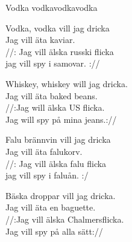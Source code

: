 \begin{song}{Vodka vodka}{vodkavodka}
\begin{vers}
Vodka, vodka vill jag dricka\\
Jag vill äta kaviar.\\
//: Jag vill älska russki flicka\\
jag vill spy i samovar. ://\\
\end{vers}
\begin{vers}
Whiskey, whiskey will jag dricka.\\
Jag vill äta baked beans.\\
//:Jag will älska US flicka.\\
Jag will spy på mina jeans.://\\
\end{vers}
\begin{vers}
Falu brännvin vill jag dricka\\
Jag vill äta falukorv.\\
//: Jag vill älska falu flicka   \\
jag vill spy i faluån. :/\\
\end{vers}
\begin{vers}
	Bäska droppar vill jag dricka.\\
	Jag vill äta en baguette.\\
	//:Jag vill älska Chalmersflicka.\\
	Jag vill spy på alla sätt://\\
\end{vers}
\end{song}

\newpage

